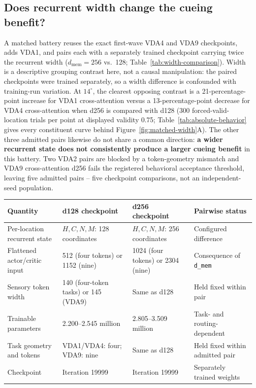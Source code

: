 \documentclass[11pt,a4paper]{article}
\begin{document}
\subsection{Does recurrent width change the cueing benefit?}\label{sec:width-behavior}
A matched battery reuses the exact first-wave VDA4 and VDA9 checkpoints, adds VDA1, and pairs each with a separately trained checkpoint carrying twice the recurrent width ($d_\mathrm{mem}=256$ vs.\ 128; Table~\ref{tab:width-comparison}). Width is a descriptive grouping contrast here, not a causal manipulation: the paired checkpoints were trained separately, so a width difference is confounded with training-run variation. At $14^\circ$, the clearest opposing contrast is a 21-percentage-point increase for VDA1 cross-attention versus a 13-percentage-point decrease for VDA4 cross-attention when d256 is compared with d128 (300 forced-valid-location trials per point at displayed validity 0.75; Table~\ref{tab:absolute-behavior} gives every constituent curve behind Figure~\ref{fig:matched-width}A). The other three admitted pairs likewise do not share a common direction: \textbf{a wider recurrent state does not consistently produce a larger cueing benefit} in this battery. Two VDA2 pairs are blocked by a token-geometry mismatch and VDA9 cross-attention d256 fails the registered behavioral acceptance threshold, leaving five admitted pairs -- five checkpoint comparisons, not an independent-seed population.

\begingroup\small
{}\label{tab:width-comparison}
\begin{tabularx}{\textwidth}{@{}p{4.0cm}Y Y Y@{}}
\toprule
Quantity & d128 checkpoint & d256 checkpoint & Pairwise status\\
\midrule
Per-location recurrent state & $H,C,N,M$: 128 coordinates & $H,C,N,M$: 256 coordinates & Configured difference\\
Flattened actor/critic input & 512 (four tokens) or 1152 (nine) & 1024 (four tokens) or 2304 (nine) & Consequence of \texttt{d\_mem}\\
Sensory token width & 140 (four-token tasks) or 145 (VDA9) & Same as d128 & Held fixed within pair\\
Trainable parameters & 2.200--2.545 million & 2.805--3.509 million & Task- and routing-dependent\\
Task geometry and tokens & VDA1/VDA4: four; VDA9: nine & Same as d128 & Held fixed within admitted pair\\
Checkpoint & Iteration 19999 & Iteration 19999 & Separately trained weights\\
\bottomrule
\end{tabularx}
\endgroup
\end{document}
